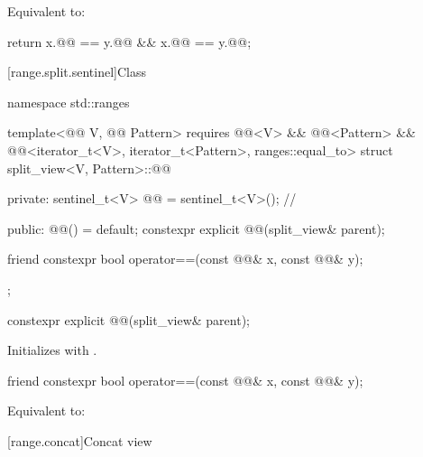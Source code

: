 \begin{itemdescr}
\pnum
\effects
Equivalent to:
\begin{codeblock}
return x.@@ == y.@@ && x.@@ == y.@@;
\end{codeblock}
\end{itemdescr}

[range.split.sentinel]{Class }

%
\begin{codeblock}
namespace std::ranges {
  template<@@ V, @@ Pattern>
    requires @@<V> && @@<Pattern> &&
             @@<iterator_t<V>, iterator_t<Pattern>, ranges::equal_to>
  struct split_view<V, Pattern>::@@ {
  private:
    sentinel_t<V> @@ = sentinel_t<V>();               // \expos

  public:
    @@() = default;
    constexpr explicit @@(split_view& parent);

    friend constexpr bool operator==(const @@& x, const @@& y);
  };
}
\end{codeblock}

%
\begin{itemdecl}
constexpr explicit @@(split_view& parent);
\end{itemdecl}

\begin{itemdescr}
\pnum
\effects
Initializes  with .
\end{itemdescr}

%
\begin{itemdecl}
friend constexpr bool operator==(const @@& x, const @@& y);
\end{itemdecl}

\begin{itemdescr}
\pnum
\effects
Equivalent to: 
\end{itemdescr}

[range.concat]{Concat view}

